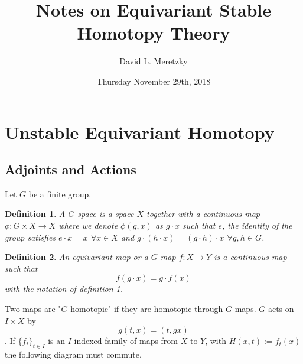 \documentclass{article}
\title{ \vspace{-10ex} %
Notes on Equivariant Stable Homotopy Theory 
}
\author{David L. Meretzky
}
\date{%
Thursday November 29th, 2018
}
\theoremstyle{problemstyle}
\theoremstyle{problemstyle}
\newtheorem{definition}{Definition}
\theoremstyle{problemstyle}
\theoremstyle{problemstyle}
\theoremstyle{problemstyle}
\theoremstyle{problemstyle}
\begin{document}
\maketitle

\section{Unstable Equivariant Homotopy}

\subsection{Adjoints and Actions}

\begin{flushleft}
Let $G$ be a finite group. 
\end{flushleft}

\begin{definition}
A $G$ space is a space $X$ together with a continuous map $\phi:G \times X \rightarrow X$ where we denote $\phi(g,x)$ as $g \cdot x$ such that $e$, the identity of the group satisfies $e \cdot x = x$ $\forall x \in X$ and $g\cdot(h\cdot x) = (g \cdot h)\cdot x$ $\forall g,h \in G$. 
\end{definition}

\begin{definition}
An equivariant map or a $G$-map $f:X\rightarrow Y$ is a continuous map such that $$f(g\cdot x) = g \cdot f(x)$$ with the notation of definition 1. 
\end{definition}

\begin{center}
\end{center}

Two maps are "$G$-homotopic" if they are homotopic through $G$-maps. $G$ acts on $I \times X$ by $$g(t,x) = (t,gx)$$. If $\{f_t\}_{t\in I}$ is an $I$ indexed family of maps from $X$ to $Y$, with $H(x,t) := f_t(x)$ the following diagram must commute. 

\begin{center}
\end{center}
\end{document}
